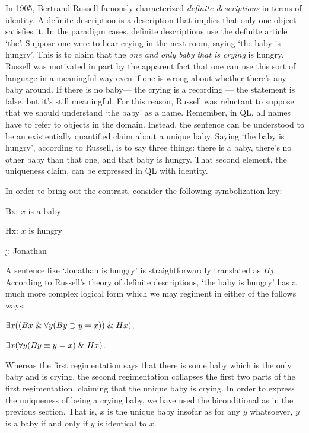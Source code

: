 In 1905, Bertrand Russell famously characterized \emph{definite descriptions} in terms of identity.
A definite description is a description that implies that only one object satisfies it.
In the paradigm cases, definite descriptions use the definite article `the'.
Suppose one were to hear crying in the next room, saying `the baby is hungry'.
This is to claim that the \emph{one and only baby that is crying} is hungry.
Russell was motivated in part by the apparent fact that one can use this sort of language in a meaningful way even if one is wrong about whether there's any baby around.
If there is no baby--- the crying is a recording --- the statement is false, but it's still meaningful.
For this reason, Russell was reluctant to suppose that we should understand `the baby' as a name.
Remember, in QL, all names have to refer to objects in the domain.
Instead, the sentence can be understood to be an existentially quantified claim about a unique baby.
Saying `the baby is hungry', according to Russell, is to say three things: there is a baby, there's no other baby than that one, and that baby is hungry.
That second element, the uniqueness claim, can be expressed in QL with identity. 

In order to bring out the contrast, consider the following symbolization key:

\begin{ekey}
  \item[Bx:] $x$ is a baby
  \item[Hx:] $x$ is hungry
  \item[j:] Jonathan
\end{ekey}

A sentence like `Jonathan is hungry' is straightforwardly translated as $Hj$.
According to Russell's theory of definite descriptions, `the baby is hungry' has a much more complex logical form which we may regiment in either of the follows ways:

\begin{earg}
  \item[\ex{Def1}] $\exists x ((Bx \mathrel\& \forall y (By \supset y = x)) \mathrel\& Hx)$.
  \item[\ex{Def2}] $\exists x (\forall y (By \equiv y = x) \mathrel\& Hx)$.
\end{earg}

Whereas the first regimentation says that there is some baby which is the only baby and is crying, the second regimentation collapses the first two parts of the first regimentation, claiming that the unique baby is crying.
In order to express the uniqueness of being a crying baby, we have used the biconditional as in the previous section.
That is, $x$ is the unique baby insofar as for any $y$ whatsoever, $y$ is a baby if and only if $y$ is identical to $x$.

